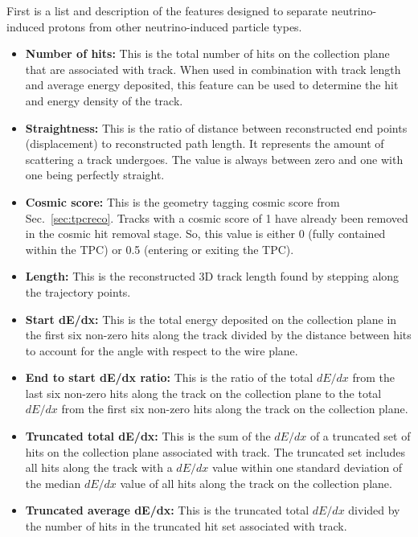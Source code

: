     First is a list and description of the features designed to separate
    neutrino-induced protons from other neutrino-induced particle types.
    \begin{itemize}
      \item \textbf{Number of hits:} This is the total number of hits on the
      collection plane that are associated with track. When used in combination
      with track length and average energy deposited, this feature can be used
      to determine the hit and energy density of the track.
      \item \textbf{Straightness:} This is the ratio of distance between
      reconstructed end points (displacement) to reconstructed path length. It
      represents the amount of scattering a track undergoes. The value is
      always between zero and one with one being perfectly straight.
      \item \textbf{Cosmic score:} This is the geometry tagging cosmic score
      from Sec.~\ref{sec:tpcreco}. Tracks with a cosmic score of 1 have already
      been removed in the cosmic hit removal stage. So, this value is either 0
      (fully contained within the TPC) or 0.5 (entering or exiting the TPC).
      \item \textbf{Length:} This is the reconstructed 3D track length found by
      stepping along the trajectory points.
      \item \textbf{Start dE/dx:} This is the total energy deposited on the
      collection plane in the first six non-zero hits along the track divided
      by the distance between hits to account for the angle with respect to the
      wire plane.
      \item \textbf{End to start dE/dx ratio:} This is the ratio of the total
      $dE/dx$ from the last six non-zero hits along the track on the collection
      plane to the total $dE/dx$ from the first six non-zero hits along the
      track on the collection plane.
      \item \textbf{Truncated total dE/dx:} This is the sum of the $dE/dx$ of a
      truncated set of hits on the collection plane associated with track. The
      truncated set includes all hits along the track with a $dE/dx$ value
      within one standard deviation of the median $dE/dx$ value of all hits
      along the track on the collection plane.
      \item \textbf{Truncated average dE/dx:} This is the truncated total
      $dE/dx$ divided by the number of hits in the truncated hit set associated
      with track.
    \end{itemize}

